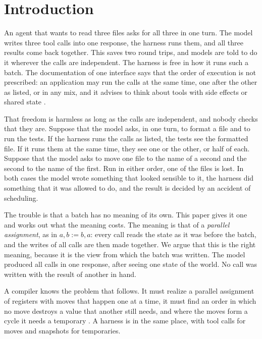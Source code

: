 \documentclass[acmsmall,nonacm,screen]{acmart}
\begin{document}
\section{Introduction}

An agent that wants to read three files asks for all three in one turn. The model writes
three tool calls into one response, the harness runs them, and all three results come back
together. This saves two round trips, and models are told to do it wherever the calls are
independent. The harness is free in how it runs such a batch. The documentation of one
interface says that the order of execution is not prescribed: an application may run the
calls at the same time, one after the other as listed, or in any mix, and it advises to
think about tools with side effects or shared state \citep{claudeparallel}.

That freedom is harmless as long as the calls are independent, and nobody checks that they
are. Suppose that the model asks, in one turn, to format a file and to run the tests. If the
harness runs the calls as listed, the tests see the formatted file. If it runs them at the
same time, they see one or the other, or half of each. Suppose that the model asks to move
one file to the name of a second and the second to the name of the first. Run in either
order, one of the files is lost. In both cases the model wrote something that looked
sensible to it, the harness did something that it was allowed to do, and the result is
decided by an accident of scheduling.

The trouble is that a batch has no meaning of its own. This paper gives it one and works
out what the meaning costs. The meaning is that of a \emph{parallel assignment}, as in
$a, b := b, a$: every call reads the state as it was before the batch, and the writes of all
calls are then made together. We argue that this is the right meaning, because it is the
view from which the batch was written. The model produced all calls in one response, after
seeing one state of the world. No call was written with the result of another in hand.

A compiler knows the problem that follows. It must realize a parallel assignment of
registers with moves that happen one at a time, it must find an order in which no move
destroys a value that another still needs, and where the moves form a cycle it needs a
temporary \citep{Sethi1973,Rideau2008}. A harness is in the same place, with tool calls for
moves and snapshots for temporaries.
\end{document}
